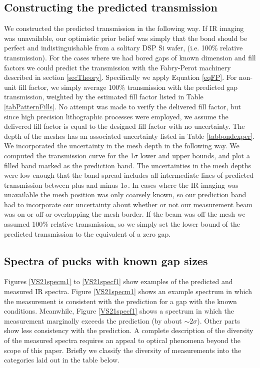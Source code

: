 \documentclass[osajnl,preprint,showpacs,superscriptaddress,12pt]{revtex4-1} %
\begin{document}
\subsection{Constructing the predicted transmission}
We constructed the predicted transmission in the following way.  If IR imaging was unavailable, our optimistic prior belief was simply that the bond should be perfect and indistinguishable from a solitary DSP Si wafer, (i.e. 100\% relative transmission).  For the cases where we had bored gaps of known dimension and fill factors we could predict the transmission with the Fabry-Perot machinery described in section \ref{secTheory}.  Specifically we apply Equation \ref{eqFP}.  For non-unit fill factor, we simply average 100\% transmission with the predicted gap transmission, weighted by the estimated fill factor listed in Table \ref{tabPatternFills}.  No attempt was made to verify the delivered fill factor, but since high precision lithographic processes were employed, we assume the delivered fill factor is equal to the designed fill factor with no uncertainty.  The depth of the meshes has an associated uncertainty listed in Table \ref{tabbondexper}.  We incorporated the uncertainty in the mesh depth in the following way.  We computed the transmission curve for the 1$\sigma$ lower and upper bounds, and plot a filled band marked as the prediction band.  The uncertainties in the mesh depths were low enough that the band spread includes all intermediate lines of predicted transmission between plus and minus 1$\sigma$.  In cases where the IR imaging was unavailable the mesh position was only coarsely known, so our prediction band had to incorporate our uncertainty about whether or not our measurement beam was on or off or overlapping the mesh border.  If the beam was off the mesh we assumed 100\% relative transmission, so we simply set the lower bound of the predicted transmission to the equivalent of a zero gap.  

\subsection{Spectra of pucks with known gap sizes}
Figures \ref{VS21specm1} to \ref{VS21specf1} show examples of the predicted and measured IR spectra.  Figure \ref{VS21specm1} shows an example spectrum in which the measurement is consistent with the prediction for a gap with the known conditions.  Meanwhile, Figure \ref{VS21specf1} shows a spectrum in which the measurement marginally exceeds the prediction (by about $\sim 2 \sigma$).  Other parts show less consistency with the prediction.  A complete description of the diversity of the measured spectra requires an appeal to optical phenomena beyond the scope of this paper.  Briefly we classify the diversity of measurements into the categories laid out in the table below.  
\end{document}
